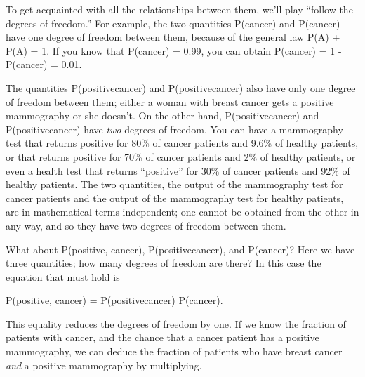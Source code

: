 {
 To get acquainted with all the relationships between them,
we'll play ``follow the degrees of
freedom.'' For example, the two quantities P(cancer)
and P({\textlnot}cancer) have one degree of freedom between them,
because of the general law P(A) + P({\textlnot}A) = 1. If you know that
P({\textlnot}cancer) = 0.99, you can obtain P(cancer) = 1 -
P({\textlnot}cancer) = 0.01.}

{
 The quantities P(positive{\textbar}cancer) and
P({\textlnot}positive{\textbar}cancer) also have only one degree of
freedom between them; either a woman with breast cancer gets a positive
mammography or she doesn't. On the other hand,
P(positive{\textbar}cancer) and P(positive{\textbar}{\textlnot}cancer)
have \textit{two} degrees of freedom. You can have a mammography test
that returns positive for 80\% of cancer patients and 9.6\% of healthy
patients, or that returns positive for 70\% of cancer patients and 2\%
of healthy patients, or even a health test that returns
``positive'' for 30\% of cancer
patients and 92\% of healthy patients. The two quantities, the output
of the mammography test for cancer patients and the output of the
mammography test for healthy patients, are in mathematical terms
independent; one cannot be obtained from the other in any way, and so
they have two degrees of freedom between them.}

{
 What about P(positive, cancer), P(positive{\textbar}cancer), and
P(cancer)? Here we have three quantities; how many degrees of freedom
are there? In this case the equation that must hold is}

{\centering
 P(positive, cancer) = P(positive{\textbar}cancer) {\texttimes}
P(cancer).
\par}


\bigskip

{
 This equality reduces the degrees of freedom by one. If we know
the fraction of patients with cancer, and the chance that a cancer
patient has a positive mammography, we can deduce the fraction of
patients who have breast cancer \textit{and} a positive mammography by
multiplying.}

